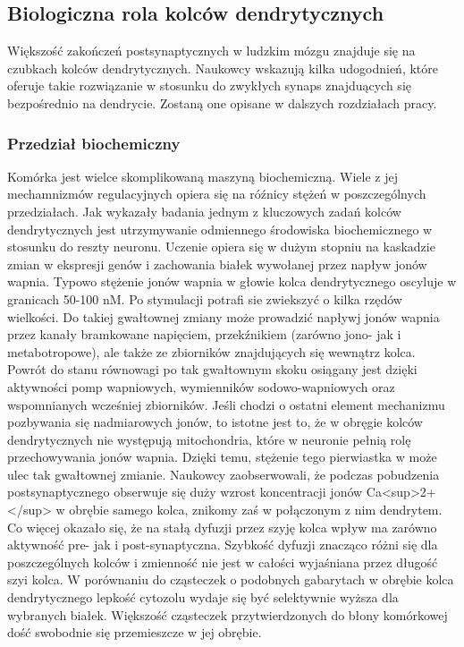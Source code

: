 \documentclass{article}
\begin{document}
\subsection{Biologiczna rola kolców dendrytycznych}
Większość zakończeń postsynaptycznych %
w ludzkim mózgu znajduje się na czubkach kolców dendrytycznych.
Naukowcy wskazują kilka udogodnień, które oferuje takie rozwiązanie w stosunku do zwykłych synaps znajduących się bezpośrednio na dendrycie.
Zostaną one opisane w dalszych rozdziałach pracy.
\subsubsection{Przedział biochemiczny}
Komórka jest wielce skomplikowaną maszyną biochemiczną. 
Wiele z jej mechamnizmów regulacyjnych opiera się na róźnicy stężeń w poszczególnych przedziałach.
Jak wykazały badania jednym z kluczowych zadań kolców dendrytycznych jest utrzymywanie odmiennego środowiska biochemicznego w stosunku do reszty neuronu.
Uczenie opiera się w dużym stopniu na kaskadzie zmian w ekspresji genów i zachowania białek wywołanej przez napływ jonów wapnia.
Typowo stężenie jonów wapnia w głowie kolca dendrytycznego oscyluje w granicach 50-100 nM.
Po stymulacji potrafi sie zwiekszyć o kilka rzędów wielkości.
Do takiej gwałtownej zmiany może prowadzić napływj jonów wapnia przez kanały bramkowane napięciem, przekźnikiem (zarówno jono- jak i metabotropowe), ale także ze zbiorników znajdujących się wewnątrz kolca.
Powrót do stanu równowagi po tak gwałtownym skoku osiągany jest dzięki aktywności pomp wapniowych, wymienników sodowo-wapniowych oraz wspomnianych wcześniej zbiorników.
Jeśli chodzi o ostatni element mechanizmu pozbywania się nadmiarowych jonów, to istotne jest to, że w obręgie kolców dendrytycznych nie występują mitochondria, które w neuronie pełnią rolę przechowywania jonów wapnia. 
Dzięki temu, stężenie tego pierwiastka w może ulec tak gwałtownej zmianie\citep{Sala2014}.
Naukowcy zaobserwowali, że podczas pobudzenia postsynaptycznego obserwuje się duży wzrost koncentracji jonów Ca<sup>{2+}</sup> w obrębie samego kolca, znikomy zaś w połączonym z nim dendrytem.
Co więcej okazało się, że na stałą dyfuzji przez szyję kolca wpływ ma zarówno aktywność pre- jak i post-synaptyczna.
Szybkość dyfuzji znacząco różni się dla poszczególnych kolców i zmienność nie jest w całości wyjaśniana przez długość szyi kolca.
W porównaniu do cząsteczek o podobnych gabarytach w obrębie kolca dendrytycznego lepkość cytozolu wydaje się być selektywnie wyższa dla wybranych białek.
Większość cząsteczek przytwierdzonych do błony komórkowej dość swobodnie się przemieszcze w jej obrębie.
\end{document}
